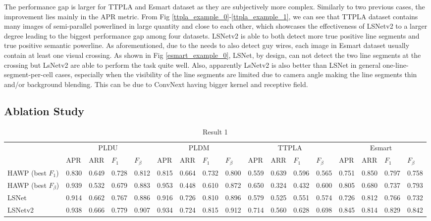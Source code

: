 \documentclass[journal]{IEEEtran}
\begin{document}
The performance gap is larger for TTPLA and Esmart dataset as they are subjectively more complex. Similarly to two previous cases, the improvement lies mainly in the APR metric. From Fig \ref{ttpla_example_0}-\ref{ttpla_example_1}, we can see that TTPLA dataset contains many images of semi-parallel powerlined in large quantity and close to each other, which showcases the effectiveness of LSNetv2 to a larger degree leading to the biggest performance gap among four datasets. LSNetv2 is able to both detect more true positive line segments and true positive semantic powerline. As aforementioned, due to the needs to also detect guy wires, each image in Esmart dataset usually contain at least one visual crossing. As shown in Fig \ref{esmart_example_0}, LSNet, by design, can not detect the two line segments at the crossing but LsNetv2 are able to perform the task quite well. Also, apparently LsNetv2 is also better than LSNet in general one-line-segment-per-cell cases, especially when the visibility of the line segments are limited due to camera angle making the line segments thin and/or background blending. This can be due to ConvNext having bigger kernel and receptive field.



\subsection{Ablation Study}



\begin{table}[]
\begin{tabular}{lllll|llll|llll|llll}
        & \multicolumn{4}{c|}{PLDU}           & \multicolumn{4}{c|}{PLDM}           & \multicolumn{4}{c|}{TTPLA}          & \multicolumn{4}{c}{Esmart}          \\ \cline{2-17} 
        & APR   & ARR   & $F_1$ & $F_{\beta}$ & APR   & ARR   & $F_1$ & $F_{\beta}$ & APR   & ARR   & $F_1$ & $F_{\beta}$ & APR   & ARR   & $F_1$ & $F_{\beta}$ \\ \hline
HAWP (best $F_1$)       & 0.830 & 0.649 & 0.728 & 0.812       & 0.815 & 0.664 & 0.732 & 0.800       & 0.559 & 0.639 & 0.596 & 0.565       & 0.751 & 0.850 & 0.797 & 0.758       \\
HAWP (best $F_\beta$)   & 0.939 & 0.532 & 0.679 & 0.883       & 0.953 & 0.448 & 0.610 & 0.872       & 0.650 & 0.324 & 0.432 & 0.600       & 0.805 & 0.680 & 0.737 & 0.793       \\
LSNet                   & 0.914 & 0.662 & 0.767 & 0.886       & 0.916 & 0.726 & 0.810 & 0.896       & 0.579 & 0.525 & 0.551 & 0.574       & 0.726 & 0.812 & 0.766 & 0.732       \\
LSNetv2                 & 0.938 & 0.666 & 0.779 & 0.907       & 0.934 & 0.724 & 0.815 & 0.912       & 0.714 & 0.560 & 0.628 & 0.698       & 0.845 & 0.814 & 0.829 & 0.842      
\end{tabular}
\caption{\label{res1_table} Result 1}
\end{table}
\end{document}
